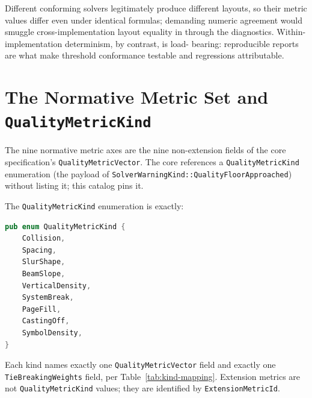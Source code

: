\documentclass[11pt,letterpaper]{report}
\newcounter{requirement}[chapter]
\begin{document}
\begin{rationale}
Different conforming solvers legitimately produce different layouts, so
their metric values differ even under identical formulas; demanding numeric
agreement would smuggle cross-implementation layout equality in through the
diagnostics. Within-implementation determinism, by contrast, is load-
bearing: reproducible reports are what make threshold conformance testable
and regressions attributable.
\end{rationale}

\section{The Normative Metric Set and \texttt{QualityMetricKind}}
\label{sec:model:kind}

The nine normative metric axes are the nine non-extension fields of the
core specification's \texttt{QualityMetricVector}. The core references a
\texttt{QualityMetricKind} enumeration (the payload of
\texttt{SolverWarningKind::QualityFloorApproached}) without listing it;
this catalog pins it.

\begin{requirement}
\label{req:qmc:kind}
The \texttt{QualityMetricKind} enumeration is exactly:

\begin{lstlisting}[language=Rust]
pub enum QualityMetricKind {
    Collision,
    Spacing,
    SlurShape,
    BeamSlope,
    VerticalDensity,
    SystemBreak,
    PageFill,
    CastingOff,
    SymbolDensity,
}
\end{lstlisting}

Each kind names exactly one \texttt{QualityMetricVector} field and exactly
one \texttt{TieBreakingWeights} field, per
Table~\ref{tab:kind-mapping}. Extension metrics are not
\texttt{QualityMetricKind} values; they are identified by
\texttt{ExtensionMetricId}.
\end{requirement}
\end{document}
